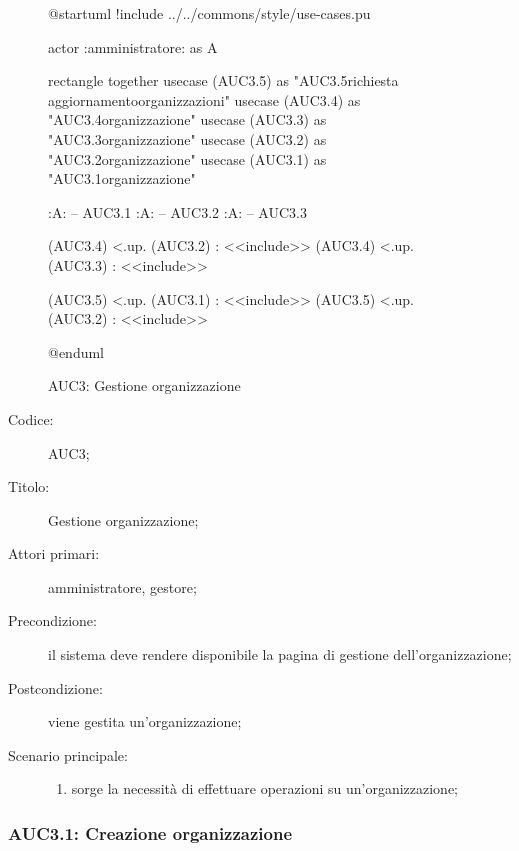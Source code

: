 \documentclass[../../../analisi-dei-requisiti.tex]{subfiles}
\begin{document}
\begin{figure}[H]
  \centering
  \begin{plantuml}
    @startuml
    !include ../../commons/style/use-cases.pu

    actor :amministratore: as A

    rectangle {
        together {
            usecase (AUC3.5) as "AUC3.5\nInvio richiesta aggiornamento\nlista organizzazioni"
            usecase (AUC3.4) as "AUC3.4\nSeleziona organizzazione"
            usecase (AUC3.3) as "AUC3.3\nModifica organizzazione"
            usecase (AUC3.2) as "AUC3.2\nEliminazione organizzazione"
            usecase (AUC3.1) as "AUC3.1\nCreazione organizzazione"
          }
      }

    :A: -- AUC3.1
    :A: -- AUC3.2
    :A: -- AUC3.3

    (AUC3.4) <.up. (AUC3.2) : <<include>>
    (AUC3.4) <.up. (AUC3.3) : <<include>>

    (AUC3.5) <.up. (AUC3.1) : <<include>>
    (AUC3.5) <.up. (AUC3.2) : <<include>>

    @enduml
  \end{plantuml}
  \caption{AUC3: Gestione organizzazione}%
  \label{fig:AUC3}
\end{figure}

\begin{description}
  \item[Codice:] AUC3;
  \item[Titolo:] Gestione organizzazione;
  \item[Attori primari:] amministratore, gestore;
  \item[Precondizione:] il sistema deve rendere disponibile la pagina di gestione dell'organizzazione;
  \item[Postcondizione:] viene gestita un'organizzazione;
  \item[Scenario principale:]
        \begin{enumerate}
          \item sorge la necessità di effettuare operazioni su un'organizzazione;
        \end{enumerate}
\end{description}

\subsubsection{AUC3.1: Creazione organizzazione}%
\label{subs:AUC3.1}
\end{document}
